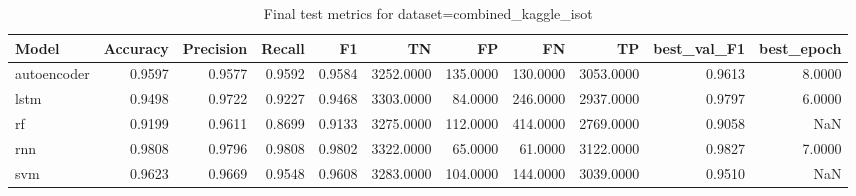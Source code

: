 \begin{table}
\caption{Final test metrics for dataset=combined_kaggle_isot}
\label{tab:final_combined_kaggle_isot}
\begin{tabular}{lrrrrrrrrrr}
\toprule
Model & Accuracy & Precision & Recall & F1 & TN & FP & FN & TP & best_val_F1 & best_epoch \\
\midrule
autoencoder & 0.9597 & 0.9577 & 0.9592 & 0.9584 & 3252.0000 & 135.0000 & 130.0000 & 3053.0000 & 0.9613 & 8.0000 \\
lstm & 0.9498 & 0.9722 & 0.9227 & 0.9468 & 3303.0000 & 84.0000 & 246.0000 & 2937.0000 & 0.9797 & 6.0000 \\
rf & 0.9199 & 0.9611 & 0.8699 & 0.9133 & 3275.0000 & 112.0000 & 414.0000 & 2769.0000 & 0.9058 & NaN \\
rnn & 0.9808 & 0.9796 & 0.9808 & 0.9802 & 3322.0000 & 65.0000 & 61.0000 & 3122.0000 & 0.9827 & 7.0000 \\
svm & 0.9623 & 0.9669 & 0.9548 & 0.9608 & 3283.0000 & 104.0000 & 144.0000 & 3039.0000 & 0.9510 & NaN \\
\bottomrule
\end{tabular}
\end{table}

